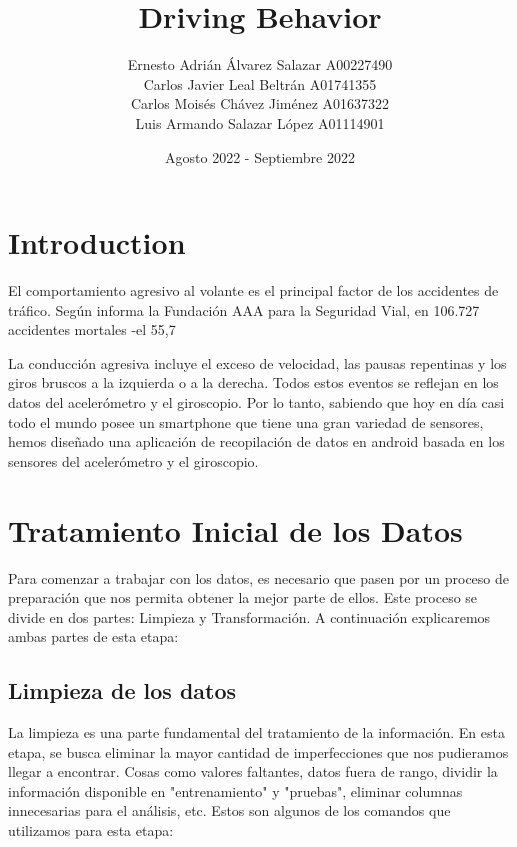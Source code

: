 \documentclass{article}
\title{Driving Behavior}
\author{
Ernesto Adrián Álvarez Salazar  A00227490\\
Carlos Javier Leal Beltrán  A01741355\\
Carlos Moisés Chávez Jiménez  A01637322\\
Luis Armando Salazar López  A01114901\\
}
\date{Agosto 2022 - Septiembre 2022}
\begin{document}
\maketitle

\section{Introduction}
El comportamiento agresivo al volante es el principal factor de los accidentes de tráfico. Según informa la Fundación AAA para la Seguridad Vial, en 106.727 accidentes mortales -el 55,7%

La conducción agresiva incluye el exceso de velocidad, las pausas repentinas y los giros bruscos a la izquierda o a la derecha. Todos estos eventos se reflejan en los datos del acelerómetro y el giroscopio. Por lo tanto, sabiendo que hoy en día casi todo el mundo posee un smartphone que tiene una gran variedad de sensores, hemos diseñado una aplicación de recopilación de datos en android basada en los sensores del acelerómetro y el giroscopio.

\section{Tratamiento Inicial de los Datos}

Para comenzar a trabajar con los datos, es necesario que pasen por un proceso de preparación que nos permita obtener la mejor parte de ellos. Este proceso se divide en dos partes: Limpieza y Transformación. A continuación explicaremos ambas partes de esta etapa:

    \subsection{Limpieza de los datos}

        La limpieza es una parte fundamental del tratamiento de la información. En esta etapa, se busca eliminar la mayor cantidad de imperfecciones que nos pudieramos llegar a encontrar. Cosas como valores faltantes, datos fuera de rango, dividir la información disponible en "entrenamiento" y "pruebas", eliminar columnas innecesarias para el análisis, etc. Estos son algunos de los comandos que utilizamos para esta etapa:
\end{document}
